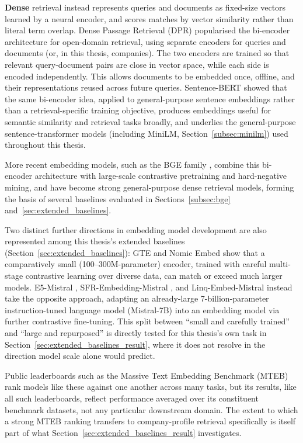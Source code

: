 \documentclass[a4paper,oneside,bibliography=totoc]{scrbook}
\begin{document}
\textbf{Dense} retrieval instead represents queries and documents as fixed-size vectors learned by a neural encoder, and scores matches by vector similarity rather than literal term overlap. Dense Passage Retrieval (DPR) \citep{karpukhin2020dense} popularised the bi-encoder architecture for open-domain retrieval, using separate encoders for queries and documents (or, in this thesis, companies). The two encoders are trained so that relevant query-document pairs are close in vector space, while each side is encoded independently. This allows documents to be embedded once, offline, and their representations reused across future queries. Sentence-BERT \citep{reimers2019sentence} showed that the same bi-encoder idea, applied to general-purpose sentence embeddings rather than a retrieval-specific training objective, produces embeddings useful for semantic similarity and retrieval tasks broadly, and underlies the general-purpose sentence-transformer models (including MiniLM, Section~\ref{subsec:minilm}) used throughout this thesis.

More recent embedding models, such as the BGE family \citep{xiao2024cpack,chen2024bge}, combine this bi-encoder architecture with large-scale contrastive pretraining and hard-negative mining, and have become strong general-purpose dense retrieval models, forming the basis of several baselines evaluated in Sections~\ref{subsec:bge} and~\ref{sec:extended_baselines}.

Two distinct further directions in embedding model development are also represented among this thesis's extended baselines (Section~\ref{sec:extended_baselines}): GTE \citep{li2023towardsgte} and Nomic Embed \citep{nussbaum2024nomic} show that a comparatively small (100--300M-parameter) encoder, trained with careful multi-stage contrastive learning over diverse data, can match or exceed much larger models. E5-Mistral \citep{wang2024improving}, SFR-Embedding-Mistral \citep{meng2024sfrembedding}, and Linq-Embed-Mistral \citep{linq2024technical} instead take the opposite approach, adapting an already-large 7-billion-parameter instruction-tuned language model (Mistral-7B) into an embedding model via further contrastive fine-tuning. This split between ``small and carefully trained'' and ``large and repurposed'' is directly tested for this thesis's own task in Section~\ref{sec:extended_baselines_result}, where it does not resolve in the direction model scale alone would predict.

Public leaderboards such as the Massive Text Embedding Benchmark (MTEB) \citep{muennighoff2023mteb} rank models like these against one another across many tasks, but its results, like all such leaderboards, reflect performance averaged over its constituent benchmark datasets, not any particular downstream domain. The extent to which a strong MTEB ranking transfers to company-profile retrieval specifically is itself part of what Section~\ref{sec:extended_baselines_result} investigates.
\end{document}
